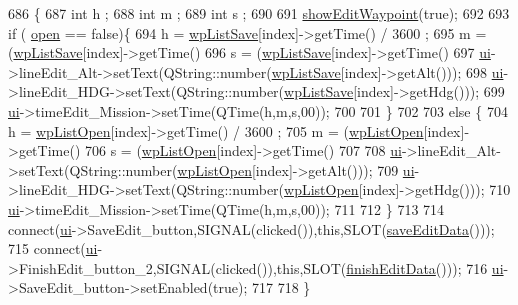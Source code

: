 \begin{DoxyCode}
686 \{
687     \textcolor{keywordtype}{int} h ;
688     \textcolor{keywordtype}{int} m ;
689     \textcolor{keywordtype}{int} s ;
690 
691    \hyperlink{a00008_a35f9f0904259437c4ae21b41c4f759c1}{showEditWaypoint}(\textcolor{keyword}{true});
692 
693     \textcolor{keywordflow}{if} ( \hyperlink{a00008_a8c7e45250b1eb6821dd59fb2a9a016d7}{open} == \textcolor{keyword}{false})\{
694         h = \hyperlink{a00008_ad11e2550a13b49086c06cf1c1dbf0a45}{wpListSave}[index]->getTime() / 3600 ;
695         m = (\hyperlink{a00008_ad11e2550a13b49086c06cf1c1dbf0a45}{wpListSave}[index]->getTime() %
696         s = (\hyperlink{a00008_ad11e2550a13b49086c06cf1c1dbf0a45}{wpListSave}[index]->getTime() %
697        \hyperlink{a00008_a6dc041ef6a2ffb329928d2913e8344e6}{ui}->lineEdit\_Alt->setText(QString::number(\hyperlink{a00008_ad11e2550a13b49086c06cf1c1dbf0a45}{wpListSave}[index]->getAlt()));
698        \hyperlink{a00008_a6dc041ef6a2ffb329928d2913e8344e6}{ui}->lineEdit\_HDG->setText(QString::number(\hyperlink{a00008_ad11e2550a13b49086c06cf1c1dbf0a45}{wpListSave}[index]->getHdg()));
699        \hyperlink{a00008_a6dc041ef6a2ffb329928d2913e8344e6}{ui}->timeEdit\_Mission->setTime(QTime(h,m,s,00));
700 
701     \}
702 
703     \textcolor{keywordflow}{else} \{
704         h = \hyperlink{a00008_a5d3a9439b166172c9c871c9a723eac19}{wpListOpen}[index]->getTime() / 3600 ;
705         m = (\hyperlink{a00008_a5d3a9439b166172c9c871c9a723eac19}{wpListOpen}[index]->getTime() %
706         s = (\hyperlink{a00008_a5d3a9439b166172c9c871c9a723eac19}{wpListOpen}[index]->getTime() %
707 
708        \hyperlink{a00008_a6dc041ef6a2ffb329928d2913e8344e6}{ui}->lineEdit\_Alt->setText(QString::number(\hyperlink{a00008_a5d3a9439b166172c9c871c9a723eac19}{wpListOpen}[index]->getAlt()));
709        \hyperlink{a00008_a6dc041ef6a2ffb329928d2913e8344e6}{ui}->lineEdit\_HDG->setText(QString::number(\hyperlink{a00008_a5d3a9439b166172c9c871c9a723eac19}{wpListOpen}[index]->getHdg()));
710        \hyperlink{a00008_a6dc041ef6a2ffb329928d2913e8344e6}{ui}->timeEdit\_Mission->setTime(QTime(h,m,s,00));
711 
712     \}
713 
714     connect(\hyperlink{a00008_a6dc041ef6a2ffb329928d2913e8344e6}{ui}->SaveEdit\_button,SIGNAL(clicked()),\textcolor{keyword}{this},SLOT(\hyperlink{a00008_a14a8662407eb95fe2c478c0cee351de5}{saveEditData}()));
715     connect(\hyperlink{a00008_a6dc041ef6a2ffb329928d2913e8344e6}{ui}->FinishEdit\_button\_2,SIGNAL(clicked()),\textcolor{keyword}{this},SLOT(\hyperlink{a00008_a7e07a9d88a66fadd639dec3139cf9f4c}{finishEditData}()));
716     \hyperlink{a00008_a6dc041ef6a2ffb329928d2913e8344e6}{ui}->SaveEdit\_button->setEnabled(\textcolor{keyword}{true});
717 
718 \}
\end{DoxyCode}
